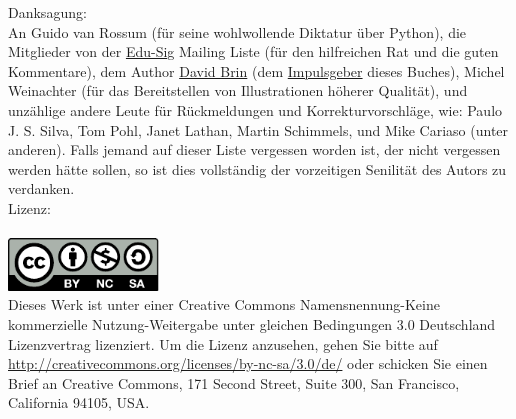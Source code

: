\noindent
Danksagung:\\
An Guido van Rossum (für seine wohlwollende Diktatur über Python), die Mitglieder von der \href{http://www.python.org/community/sigs/current/edu-sig/}{Edu-Sig} Mailing Liste (für den hilfreichen Rat und die guten Kommentare), dem Author \href{http://www.davidbrin.com/}{David Brin} (dem \href{http://www.salon.com/tech/feature/2006/09/14/basic/}{Impulsgeber} dieses Buches), Michel Weinachter (für das Bereitstellen von Illustrationen höherer Qualität), und unzählige andere Leute für Rückmeldungen und Korrekturvorschläge, wie: Paulo J. S. Silva, Tom Pohl, Janet Lathan, Martin Schimmels, und Mike Cariaso (unter anderen).  Falls jemand auf dieser Liste vergessen worden ist, der nicht vergessen werden hätte sollen, so ist dies vollständig der vorzeitigen Senilität des Autors zu verdanken.\\
\noindent
Lizenz:\\
\\
\includegraphics[width=40mm]{images/by-nc-sa}\\
Dieses Werk ist unter einer Creative Commons Namensnennung-Keine kommerzielle Nutzung-Weitergabe unter gleichen Bedingungen 3.0 Deutschland Lizenzvertrag lizenziert. Um die Lizenz anzusehen, gehen Sie bitte auf \\
\href{http://creativecommons.org/licenses/by-nc-sa/3.0/de/}{http://creativecommons.org/licenses/by-nc-sa/3.0/de/} oder schicken Sie einen Brief an Creative Commons, 171 Second Street, Suite 300, San Francisco, California 94105, USA.

